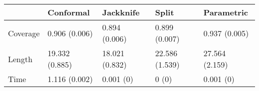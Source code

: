 \begin{tabular}{|l|l|l|l|l|}
\hline
& Conformal & Jackknife & Split & Parametric \\
\hline
Coverage & 0.906 (0.006) & 0.894 (0.006) & 0.899 (0.007) & 0.937 (0.005) \\
\hline
Length & 19.332 (0.885) & 18.021 (0.832) & 22.586 (1.539) & 27.564 (2.159) \\
\hline
Time & 1.116 (0.002) & 0.001 (0) & 0 (0) & 0.001 (0) \\
\hline
\end{tabular}
